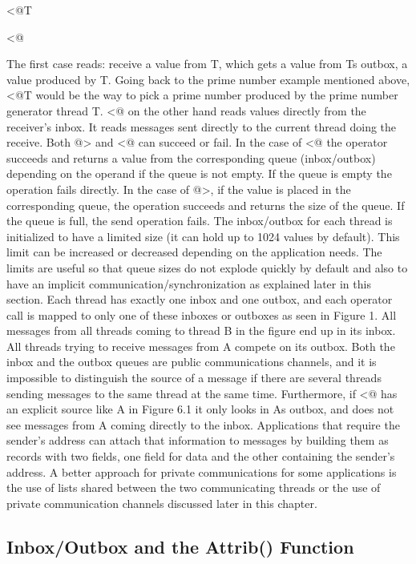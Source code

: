 <@T

<@

The first case reads: receive a value from T, which gets a value from Ts outbox,
a value produced by T. Going back to the prime number example mentioned above,
<@T would be the way to pick a prime number produced by the prime number generator
thread T. <@ on the other hand reads values directly from the receiver's inbox.
It reads messages sent directly to the current thread doing the receive.
Both @> and <@ can succeed or fail. In the case of <@ the operator succeeds and
returns a value from the corresponding queue (inbox/outbox) depending on the operand
if the queue is not empty. If the queue is empty the operation fails directly.
In the case of @>, if the value is placed in the corresponding queue, the operation
succeeds and returns the size of the queue. If the queue is full, the send operation
fails. The inbox/outbox for each thread is initialized to have a limited size (it can
hold up to 1024 values by default). This limit can be increased or decreased depending
on the application needs. The limits are useful so that queue sizes do not explode
quickly by default and also to have an implicit communication/synchronization as explained
later in this section.  
Each thread has exactly one inbox and one outbox, and each operator call is mapped to only
one of these inboxes or outboxes as seen in Figure 1. All messages from all threads coming
to thread B in the figure end up in its inbox. All threads trying to receive messages
from A compete on its outbox. Both the inbox and the outbox queues are public communications
channels, and it is impossible to distinguish the source of a message if there are several
threads sending messages to the same thread at the same time. Furthermore, if <@ has an
explicit source like A in Figure 6.1 it only looks in As outbox, and does not see messages
from A coming directly to the inbox. Applications that require the sender's address can attach
that information to messages by building them as records with two fields, one field for data and
the other containing the sender's address. A better approach for private communications for some
applications is the use of lists shared between the two communicating threads or the use of
private communication channels discussed later in this chapter. 

\subsection{Inbox/Outbox and the Attrib() Function}

